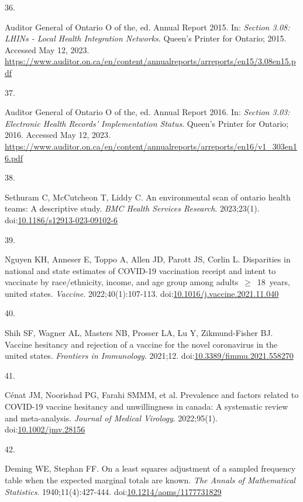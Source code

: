 \documentclass[
  letterpaper,
  DIV=11,
  numbers=noendperiod]{scrartcl}
\newlength{\cslhangindent}
\newlength{\csllabelwidth}
\newlength{\cslentryspacingunit} %
\newenvironment{CSLReferences}[2] %
 {%
  \setlength{\parindent}{0pt}
  \ifodd #1
  \let\oldpar\par
  \def\par{\hangindent=\cslhangindent\oldpar}
  \fi
  \setlength{\parskip}{#2\cslentryspacingunit}
 }%
 {}
\newcommand{\CSLLeftMargin}[1]{\parbox[t]{\csllabelwidth}{#1}}
\newcommand{\CSLRightInline}[1]{\parbox[t]{\linewidth - \csllabelwidth}{#1}\break}
\begin{document}
\begin{CSLReferences}{0}{0}
\leavevmode{}%
\CSLLeftMargin{36. }%
\CSLRightInline{Auditor General of Ontario O of the, ed. Annual {R}eport
2015. In: \emph{Section 3.08: LHINs - Local Health Integration
Networks}. Queen's Printer for Ontario; 2015. Accessed May 12, 2023.
\url{https://www.auditor.on.ca/en/content/annualreports/arreports/en15/3.08en15.pdf}}

\leavevmode{}%
\CSLLeftMargin{37. }%
\CSLRightInline{Auditor General of Ontario O of the, ed. Annual {R}eport
2016. In: \emph{Section 3.03: Electronic Health Records' Implementation
Status}. Queen's Printer for Ontario; 2016. Accessed May 12, 2023.
\url{https://www.auditor.on.ca/en/content/annualreports/arreports/en16/v1_303en16.pdf}}

\leavevmode{}%
\CSLLeftMargin{38. }%
\CSLRightInline{Sethuram C, McCutcheon T, Liddy C. An environmental scan
of ontario health teams: A descriptive study. \emph{{BMC} Health
Services Research}. 2023;23(1).
doi:\href{https://doi.org/10.1186/s12913-023-09102-6}{10.1186/s12913-023-09102-6}}

\leavevmode{}%
\CSLLeftMargin{39. }%
\CSLRightInline{Nguyen KH, Anneser E, Toppo A, Allen JD, Parott JS,
Corlin L. Disparities in national and state estimates of {COVID}-19
vaccination receipt and intent to vaccinate by race/ethnicity, income,
and age group among adults~\(\geq\)~18~years, united states.
\emph{Vaccine}. 2022;40(1):107-113.
doi:\href{https://doi.org/10.1016/j.vaccine.2021.11.040}{10.1016/j.vaccine.2021.11.040}}

\leavevmode{}%
\CSLLeftMargin{40. }%
\CSLRightInline{Shih SF, Wagner AL, Masters NB, Prosser LA, Lu Y,
Zikmund-Fisher BJ. Vaccine hesitancy and rejection of a vaccine for the
novel coronavirus in the united states. \emph{Frontiers in Immunology}.
2021;12.
doi:\href{https://doi.org/10.3389/fimmu.2021.558270}{10.3389/fimmu.2021.558270}}

\leavevmode{}%
\CSLLeftMargin{41. }%
\CSLRightInline{Cénat JM, Noorishad PG, Farahi SMMM, et al. Prevalence
and factors related to {COVID}-19 vaccine hesitancy and unwillingness in
canada: A systematic review and meta-analysis. \emph{Journal of Medical
Virology}. 2022;95(1).
doi:\href{https://doi.org/10.1002/jmv.28156}{10.1002/jmv.28156}}

\leavevmode{}%
\CSLLeftMargin{42. }%
\CSLRightInline{Deming WE, Stephan FF. On a least squares adjustment of
a sampled frequency table when the expected marginal totals are known.
\emph{The Annals of Mathematical Statistics}. 1940;11(4):427-444.
doi:\href{https://doi.org/10.1214/aoms/1177731829}{10.1214/aoms/1177731829}}


\end{CSLReferences}
\end{document}
